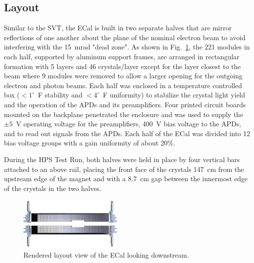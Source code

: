 \documentclass[final,3p,times,twocolumn]{elsarticle}
\begin{document}
\subsection{Layout}
Similar to the SVT, the ECal is built in two separate halves that are mirror reflections of one another 
about the plane of the nominal electron beam to avoid interfering with the 15~mrad "dead zone". 
As shown in Fig.~\ref{fig:ecal}, the 221 modules in each half, supported by aluminum support frames, 
are arranged in rectangular formation with 5 layers and 46 crystals/layer except for the layer closest to 
the beam where 9 modules were removed to allow a larger opening for the outgoing electron and 
photon beams. Each half was enclosed in a temperature controlled box ($<1^{\circ}$~F stability and 
$<4^{\circ}$~F uniformity) to stabilize the crystal light yield and the operation of the APDs and its 
preamplifiers. 
Four printed circuit boards mounted on the backplane penetrated the enclosure and was used to 
supply the $\pm 5$~V operating voltage for the preamplifiers, 400~V bias voltage to the APDs, and to 
read out signals from the APDs. Each half of the ECal was divided into 12 bias voltage groups with a 
gain uniformity of about 20\%. 

During the HPS Test Run, both halves were held in place by four vertical bars attached to an above rail, 
placing the front face of the crystals 147~cm from the upstream edge of the magnet and with a 
8.7~cm gap between the innermost edge of the crystals in the two halves.
{\small
\begin{figure}[]
\begin{center}
\includegraphics[width=0.45\textwidth]{figures/ECal}
\caption{Rendered layout view of the ECal looking downstream.}
\label{fig:ecal}
\end{center}
\end{figure}
}
\end{document}
